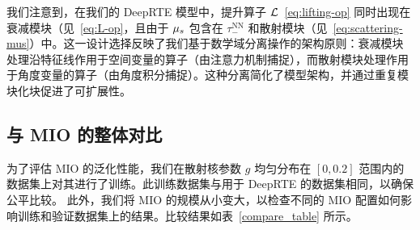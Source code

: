 我们注意到，在我们的 DeepRTE 模型中，提升算子 $\mathcal{L}$~\eqref{eq:lifting-op} 同时出现在衰减模块（见~\eqref{eq:L-op}，且由于 $\mu_s$ 包含在 $\tau_{-}^{\text{NN}}$ 和散射模块（见~\eqref{eq:scattering-mus}）中。这一设计选择反映了我们基于数学域分离操作的架构原则：衰减模块处理沿特征线作用于空间变量的算子（由注意力机制捕捉），而散射模块处理作用于角度变量的算子（由角度积分捕捉）。这种分离简化了模型架构，并通过重复模块化块促进了可扩展性。

\subsection{与 MIO 的整体对比}

为了评估 MIO 的泛化性能，我们在散射核参数 $g$ 均匀分布在 $[0, 0.2]$ 范围内的数据集上对其进行了训练。此训练数据集与用于 DeepRTE 的数据集相同，以确保公平比较。
此外，我们将 MIO 的规模从小变大，以检查不同的 MIO 配置如何影响训练和验证数据集上的结果。比较结果如表~\ref{compare_table} 所示。

